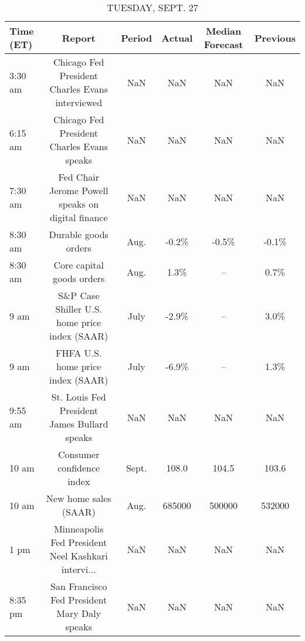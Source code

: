 \documentclass{book}
\begin{document}
  
  
  \begin{table}[htbp]%
  \caption{TUESDAY, SEPT. 27}%
  \centering%
  \begin{adjustbox}{width=1\textwidth}%
  \begin{tabular}{lccccc}
  \toprule
  Time (ET) &                                             Report & Period & Actual & Median Forecast & Previous \\
  \midrule
    3:30 am &    Chicago Fed President Charles Evans interviewed &    NaN &    NaN &             NaN &      NaN \\
    6:15 am &         Chicago Fed President Charles Evans speaks &    NaN &    NaN &             NaN &      NaN \\
    7:30 am &  Fed Chair Jerome Powell speaks on digital finance &    NaN &    NaN &             NaN &      NaN \\
    8:30 am &                               Durable goods orders &   Aug. &  -0.2\% &           -0.5\% &    -0.1\% \\
    8:30 am &                          Core capital goods orders &   Aug. &   1.3\% &              -- &     0.7\% \\
       9 am &      S\&P Case Shiller U.S. home price index (SAAR) &   July &  -2.9\% &              -- &     3.0\% \\
       9 am &                  FHFA U.S. home price index (SAAR) &   July &  -6.9\% &              -- &     1.3\% \\
    9:55 am &       St. Louis Fed President James Bullard speaks &    NaN &    NaN &             NaN &      NaN \\
      10 am &                          Consumer confidence index &  Sept. &  108.0 &           104.5 &    103.6 \\
      10 am &                              New home sales (SAAR) &   Aug. & 685000 &          500000 &   532000 \\
       1 pm & Minneapolis Fed President Neel Kashkari intervi... &    NaN &    NaN &             NaN &      NaN \\
    8:35 pm &       San Francisco Fed President Mary Daly speaks &    NaN &    NaN &             NaN &      NaN \\
  \bottomrule
  \end{tabular}
  \end{adjustbox}%
  \end{table}
  
  
\end{document}
